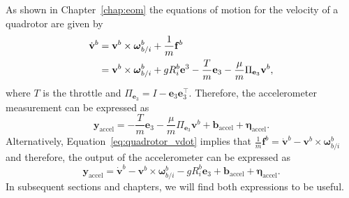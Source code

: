 As shown in Chapter~\ref{chap:eom} the equations of motion for the velocity of a quadrotor are given by
\begin{align}
\dot{\mathbf{v}}^b &= \mathbf{v}^b\times\boldsymbol{\omega}_{b/i}^b +\frac{1}{m}\mathbf{f}^b \label{eq:quadrotor_vdot} \\
             &= \mathbf{v}^b\times\boldsymbol{\omega}_{b/i}^b + gR_i^b \mathbf{e}^3 - \frac{T}{m}\mathbf{e}_3 - \frac{\mu}{m}\Pi_{\mathbf{e}_3}\mathbf{v}^b,
             \notag
\end{align}
where $T$ is the throttle and $\Pi_{\mathbf{e}_3} = I-\mathbf{e}_3\mathbf{e}_3^\top$.  Therefore, the accelerometer measurement can be expressed as
\[
\mathbf{y}_{\text{accel}} = - \frac{T}{m}\mathbf{e}_3 - \frac{\mu}{m}\Pi_{\mathbf{e}_3}\mathbf{v}^b + \mathbf{b}_{\text{accel}} + \boldsymbol{\eta}_{\text{accel}}.
\]
Alternatively, Equation~\eqref{eq:quadrotor_vdot} implies that $\frac{1}{m}\mathbf{f}^b = \dot{\mathbf{v}}^b - \mathbf{v}^b\times\boldsymbol{\omega}_{b/i}^b$ and therefore, the output of the accelerometer can be expressed as
\begin{equation} \label{eq:accelerometer_measurement_3}
\mathbf{y}_{\text{accel}} = \dot{\mathbf{v}}^b - \mathbf{v}^b\times\boldsymbol{\omega}_{b/i}^b - gR_i^b\mathbf{e}_3 + \mathbf{b}_{\text{accel}} + \boldsymbol{\eta}_{\text{accel}}.
\end{equation}
In subsequent sections and chapters, we will find both expressions to be useful.

